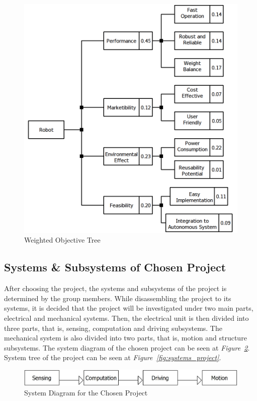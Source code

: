 \documentclass[a4paper,12pt]{article}
\begin{document}
	\begin{figure}[H]
		\centering
		\includegraphics[width=.7\textwidth,center]{objective-tree/objective-tree} 
		\caption{\label{fig:product_tree}Weighted Objective Tree}
	\end{figure}
	
	
	
	\subsection{Systems \& Subsystems of Chosen Project}
		
	After choosing the project, the systems and subsystems of the project is determined by the group members. While disassembling the project to its systems, it is decided that the project will be investigated under two main parts, electrical and mechanical systems. Then, the electrical unit is then divided into three parts, that is, sensing, computation and driving subsystems. The mechanical system is also divided into two parts, that is, motion and structure subsystems. The system diagram of the chosen project can be seen at \textit{Figure~\ref{fig:system_diagram}}. System tree of the project can be seen at \textit{Figure~\ref{fig:systems_project}}.
	
	\begin{figure}[H]
		\centering
		\includegraphics[width=\textwidth,height=\textheight,keepaspectratio]{product-tree/system-flow} 
		\caption{\label{fig:system_diagram}System Diagram for the Chosen Project}
	\end{figure}
	
\end{document}
